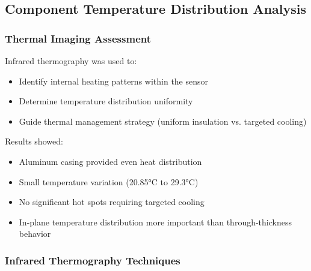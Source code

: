 \subsection*{Component Temperature Distribution Analysis}

\subsubsection*{Thermal Imaging Assessment}

Infrared thermography was used to:
\begin{itemize}
    \item Identify internal heating patterns within the sensor
    \item Determine temperature distribution uniformity
    \item Guide thermal management strategy (uniform insulation vs. targeted cooling)
\end{itemize}

Results showed:
\begin{itemize}
    \item Aluminum casing provided even heat distribution
    \item Small temperature variation (20.85°C to 29.3°C)
    \item No significant hot spots requiring targeted cooling
    \item In-plane temperature distribution more important than through-thickness behavior
\end{itemize}

\subsubsection*{Infrared Thermography Techniques}

